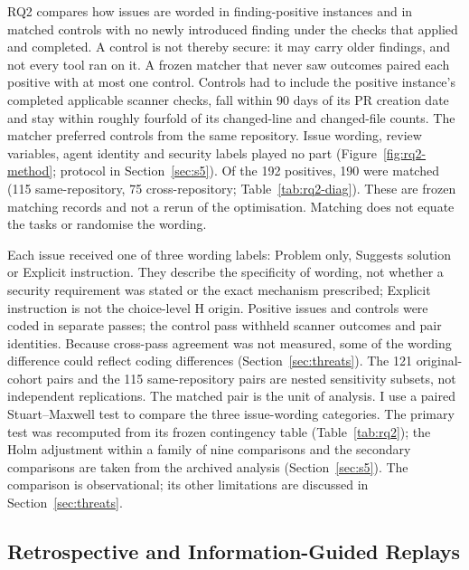 \documentclass[acmsmall,screen,nonacm]{acmart}
\begin{document}
RQ2 compares how issues are worded in finding-positive instances and in matched controls with no newly introduced finding under the checks that applied and completed. A control is not thereby secure: it may carry older findings, and not every tool ran on it. A frozen matcher that never saw outcomes paired each positive with at most one control. Controls had to include the positive instance's completed applicable scanner checks, fall within 90 days of its PR creation date and stay within roughly fourfold of its changed-line and changed-file counts. The matcher preferred controls from the same repository. Issue wording, review variables, agent identity and security labels played no part (Figure~\ref{fig:rq2-method}; protocol in Section~\ref{sec:s5}). Of the 192 positives, 190 were matched (115 same-repository, 75 cross-repository; Table~\ref{tab:rq2-diag}). These are frozen matching records and not a rerun of the optimisation. Matching does not equate the tasks or randomise the wording.

Each issue received one of three wording labels: Problem only, Suggests solution or Explicit instruction. They describe the specificity of wording, not whether a security requirement was stated or the exact mechanism prescribed; Explicit instruction is not the choice-level H origin. Positive issues and controls were coded in separate passes; the control pass withheld scanner outcomes and pair identities. Because cross-pass agreement was not measured, some of the wording difference could reflect coding differences (Section~\ref{sec:threats}). The 121 original-cohort pairs and the 115 same-repository pairs are nested sensitivity subsets, not independent replications. The matched pair is the unit of analysis. I use a paired Stuart--Maxwell test to compare the three issue-wording categories. The primary test was recomputed from its frozen contingency table (Table~\ref{tab:rq2}); the Holm adjustment within a family of nine comparisons and the secondary comparisons are taken from the archived analysis (Section~\ref{sec:s5}). The comparison is observational; its other limitations are discussed in Section~\ref{sec:threats}.

\subsection{Retrospective and Information-Guided Replays}\label{sec:rq3-design}
\end{document}
